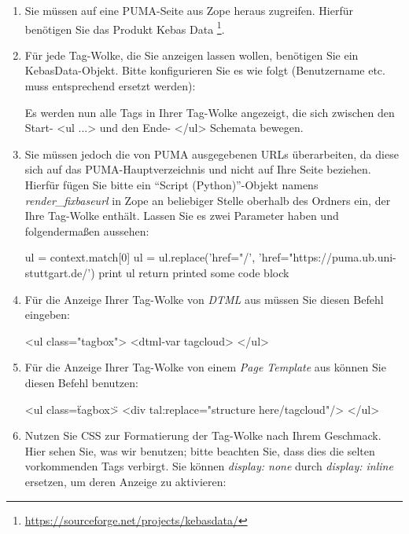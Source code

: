 \begin{enumerate}
    \item Sie müssen auf eine PUMA-Seite aus Zope heraus zugreifen. Hierfür benötigen Sie das Produkt Kebas Data \footnote{\url{https://sourceforge.net/projects/kebasdata/}}.
    \item Für jede Tag-Wolke, die Sie anzeigen lassen wollen, benötigen Sie ein KebasData-Objekt. Bitte konfigurieren Sie es wie folgt (Benutzername etc. muss entsprechend ersetzt werden):%

    Es werden nun alle Tags in Ihrer Tag-Wolke angezeigt, die sich zwischen den Start- <ul ...> und den Ende- </ul> Schemata bewegen.
    \item Sie müssen jedoch die von PUMA ausgegebenen URLs überarbeiten, da diese sich auf das PUMA-Hauptverzeichnis und nicht auf Ihre Seite beziehen. Hierfür fügen Sie bitte ein \enquote{Script (Python)}-Objekt namens \textit{render\_fixbaseurl} in Zope an beliebiger Stelle oberhalb des Ordners ein, der Ihre Tag-Wolke enthält. Lassen Sie es zwei Parameter haben und folgendermaßen aussehen: 

    ul = context.match[0]\newline
    ul = ul.replace('href="/', 'href="https://puma.ub.uni-stuttgart.de/')\newline
    print ul\newline
    return printed\newline
    some code block

    \item Für die Anzeige Ihrer Tag-Wolke von \textit{DTML} aus müssen Sie diesen Befehl eingeben: 

    <ul class="tagbox">\newline
        <dtml-var tagcloud>\newline
    </ul> \newline

    \item Für die Anzeige Ihrer Tag-Wolke von einem \textit{Page Template} aus können Sie diesen Befehl benutzen: 

    <ul class=\"tagbox\">\newline
        <div tal:replace="structure here/tagcloud"/>\newline
    </ul>\newline

    \item Nutzen Sie CSS zur Formatierung der Tag-Wolke nach Ihrem Geschmack. Hier sehen Sie, was wir benutzen; bitte beachten Sie, dass dies die selten vorkommenden Tags verbirgt. Sie können \textit{display: none} durch \textit{display: inline} ersetzen, um deren Anzeige zu aktivieren: 


\end{enumerate}
